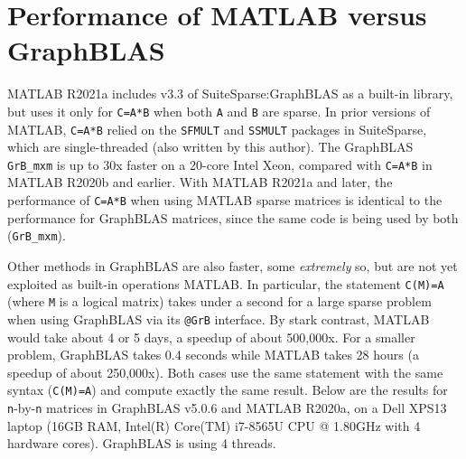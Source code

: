 \documentclass[12pt]{article}
\begin{document}
\section{Performance of MATLAB versus GraphBLAS}
\label{matlab_performance}

MATLAB R2021a includes v3.3 of SuiteSparse:GraphBLAS as a built-in library, but
uses it only for \verb'C=A*B' when both \verb'A' and \verb'B' are sparse.  In
prior versions of MATLAB, \verb'C=A*B' relied on the \verb'SFMULT' and
\verb'SSMULT' packages in SuiteSparse, which are single-threaded (also written
by this author).  The GraphBLAS \verb'GrB_mxm' is up to 30x faster on a 20-core
Intel Xeon, compared with \verb'C=A*B' in MATLAB R2020b and earlier.  With
MATLAB R2021a and later, the performance of \verb'C=A*B' when using MATLAB
sparse matrices is identical to the performance for GraphBLAS matrices, since
the same code is being used by both (\verb'GrB_mxm').

Other methods in GraphBLAS are also faster, some {\em extremely} so, but are
not yet exploited as built-in operations MATLAB.  In particular, the statement
\verb'C(M)=A' (where \verb'M' is a logical matrix) takes under a second for a
large sparse problem when using GraphBLAS via its \verb'@GrB' interface.  By
stark contrast, MATLAB would take about 4 or 5 days, a speedup of about
500,000x.  For a smaller problem, GraphBLAS takes 0.4 seconds while MATLAB
takes 28 hours (a speedup of about 250,000x).  Both cases use the same
statement with the same syntax (\verb'C(M)=A') and compute exactly the same
result.  Below are the results for \verb'n'-by-\verb'n' matrices in GraphBLAS
v5.0.6 and MATLAB R2020a, on a Dell XPS13 laptop (16GB RAM, Intel(R) Core(TM)
i7-8565U CPU @ 1.80GHz with 4 hardware cores).  GraphBLAS is using 4 threads.
\end{document}
